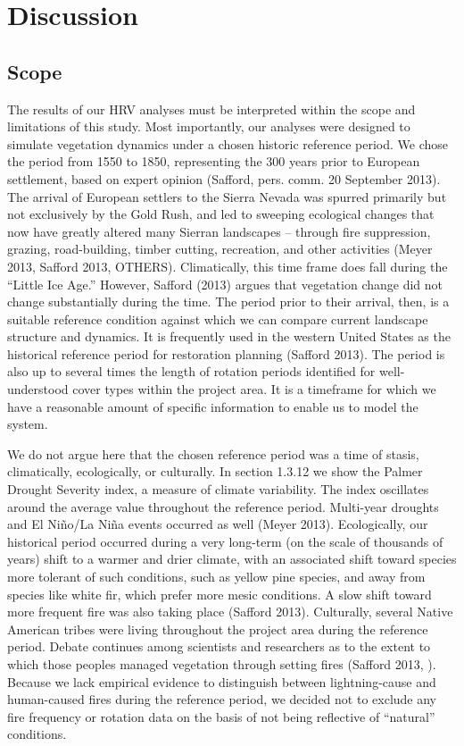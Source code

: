\chapter{Discussion}
\section{Scope}
The results of our HRV analyses must be interpreted within the scope and limitations of this study. Most importantly, our analyses were designed to simulate vegetation dynamics under a chosen historic reference period. We chose the period from 1550 to 1850, representing the 300 years prior to European settlement, based on expert opinion (Safford, pers. comm. 20 September 2013). The arrival of European settlers to the Sierra Nevada was spurred primarily but not exclusively by the Gold Rush, and led to sweeping ecological changes that now have greatly altered many Sierran landscapes -- through fire suppression, grazing, road-building, timber cutting, recreation, and other activities (Meyer 2013, Safford 2013, OTHERS). Climatically, this time frame does fall during the ``Little Ice Age.'' However, Safford (2013) argues that vegetation change did not change substantially during the time. The period prior to their arrival, then, is a suitable reference condition against which we can compare current landscape structure and dynamics. It is frequently used in the western United States as the historical reference period for restoration planning (Safford 2013). The period is also up to several times the length of rotation periods identified for well-understood cover types within the project area. It is a timeframe for which we have a reasonable amount of specific information to enable us to model the system.

We do not argue here that the chosen reference period was a time of stasis, climatically, ecologically, or culturally. In section 1.3.12 we show the Palmer Drought Severity index, a measure of climate variability. The index oscillates around the average value throughout the reference period. Multi-year droughts and El Niño/La Niña events occurred as well (Meyer 2013). Ecologically, our historical period occurred during a very long-term (on the scale of thousands of years) shift to a warmer and drier climate, with an associated shift toward species more tolerant of such conditions, such as yellow pine species, and away from species like white fir, which prefer more mesic conditions. A slow shift toward more frequent fire was also taking place (Safford 2013). Culturally, several Native American tribes were living throughout the project area during the reference period. Debate continues among scientists and researchers as to the extent to which those peoples managed vegetation through setting fires (Safford 2013, ). Because we lack empirical evidence to distinguish between lightning-cause and human-caused fires during the reference period, we decided not to exclude any fire frequency or rotation data on the basis of not being reflective of ``natural'' conditions.

